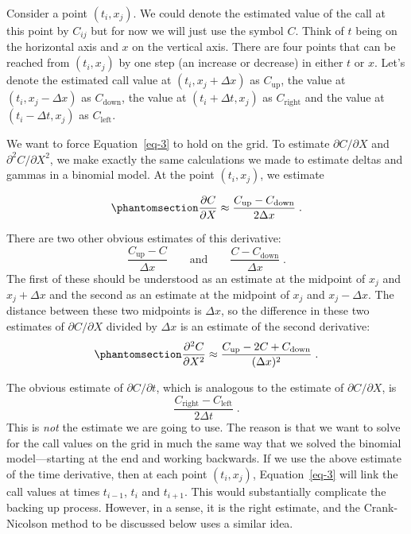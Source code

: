\documentclass[
  letterpaper,
  DIV=11,
  numbers=noendperiod]{scrartcl}
\theoremstyle{definition}
\theoremstyle{remark}
\begin{document}
Consider a point \((t_i, x_j)\). We could denote the estimated value of
the call at this point by \(C_{ij}\) but for now we will just use the
symbol \(C\). Think of \(t\) being on the horizontal axis and \(x\) on
the vertical axis. There are four points that can be reached from
\((t_i,x_j)\) by one step (an increase or decrease) in either \(t\) or
\(x\). Let's denote the estimated call value at \((t_i, x_j+\Delta x)\)
as \(C_{\text{up}}\), the value at \((t_i,x_j-\Delta x)\) as
\(C_{\text{down}}\), the value at \((t_i+\Delta t, x_j)\) as
\(C_{\text{right}}\) and the value at \((t_i-\Delta t,x_j)\) as
\(C_{\text{left}}\).

We want to force Equation~\ref{eq-3} to hold on the grid. To estimate
\(\partial C/\partial X\) and \(\partial^2 C/\partial X^2\), we make
exactly the same calculations we made to estimate deltas and gammas in a
binomial model. At the point \((t_i,x_j)\), we estimate

\begin{equation}\phantomsection\label{eq-pdedelta}{
\frac{\partial C}{\partial X} \approx \frac{C_{\text{up}}-C_{\text{down}}}{2\Delta x}\; .
}\end{equation}

There are two other obvious estimates of this derivative: \[
\frac{C_{\text{up}}-C}{\Delta x} \qquad \text{and} \qquad \frac{C-C_{\text{down}}}{\Delta x}\;.
\] The first of these should be understood as an estimate at the
midpoint of \(x_j\) and \(x_j+\Delta x\) and the second as an estimate
at the midpoint of \(x_j\) and \(x_j-\Delta x\). The distance between
these two midpoints is \(\Delta x\), so the difference in these two
estimates of \(\partial C/\partial X\) divided by \(\Delta x\) is an
estimate of the second derivative:
\begin{equation}\phantomsection\label{eq-pdegamma}{
\frac{\partial^2 C}{\partial X^2} \approx \frac{C_{\text{up}}-2C+C_{\text{down}}}{(\Delta x)^2}\;.
}\end{equation}

The obvious estimate of \(\partial C/\partial t\), which is analogous to
the estimate of \(\partial C/\partial X\), is \[
\frac{C_{\text{right}}-C_{\text{left}}}{2\Delta t}\;.
\] This is \emph{not} the estimate we are going to use. The reason is
that we want to solve for the call values on the grid in much the same
way that we solved the binomial model---starting at the end and working
backwards. If we use the above estimate of the time derivative, then at
each point \((t_i,x_j)\), Equation~\ref{eq-3} will link the call values
at times \(t_{i-1}\), \(t_i\) and \(t_{i+1}\). This would substantially
complicate the backing up process. However, in a sense, it is the right
estimate, and the Crank-Nicolson method to be discussed below uses a
similar idea.
\end{document}

